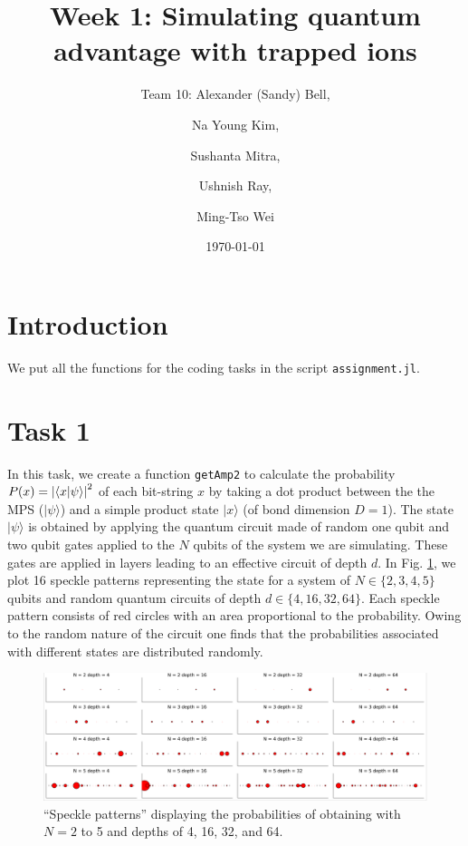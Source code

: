 \documentclass[12pt]{article}
\title{Week 1: Simulating quantum advantage with trapped ions}
\author{Team 10: Alexander (Sandy) Bell, 
\and Na Young Kim, 
\and Sushanta Mitra, 
\and Ushnish Ray, 
\and Ming-Tso Wei}
\date{\today}
\begin{document}
\maketitle



\section*{Introduction}

We put all the functions for the coding tasks in the script \texttt{assignment.jl}.



\section*{Task 1}
In this task, we create a function \texttt{getAmp2} to calculate the probability $P(x)= \abs{\ip{x}{\psi}}^2$ of each bit-string $x$ by taking a dot product between the the MPS ($|\psi\rangle$) and a simple product state $|x\rangle$
(of bond dimension $D = 1$). The state $|\psi\rangle$ is obtained by applying the quantum circuit made of random one qubit and two qubit gates applied to the $N$ qubits of the system we are simulating. These gates are applied in layers leading to an effective circuit of depth $d$. In Fig. \ref{fig:speckle}, we plot 16 speckle patterns representing the state for a system of $N \in \{2,3,4,5\}$ qubits and random quantum circuits of depth $d \in \{ 4, 16, 32, 64\}$. Each speckle pattern consists of red circles with an area proportional to the probability. Owing to the random nature of the circuit one finds that the probabilities associated with different states are distributed randomly.

\begin{figure}[!b]
	\centering
	\includegraphics [width=\linewidth] {figures/Task_1a}
	\caption{
		``Speckle patterns'' displaying the probabilities of obtaining with $N=2$ to 5 and depths of 4, 16, 32, and 64.
	}
	\label{fig:speckle}
\end{figure}
\end{document}
